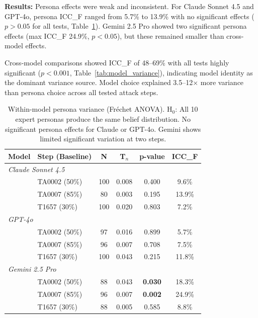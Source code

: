 \documentclass[midterm]{sparreport}
\begin{document}
\textbf{Results:} Persona effects were weak and inconsistent. For Claude Sonnet 4.5 and GPT-4o, persona ICC\_F ranged from 5.7\% to 13.9\% with no significant effects ($p > 0.05$ for all tests, Table~\ref{tab:persona_variance}). Gemini 2.5 Pro showed two significant persona effects (max ICC\_F 24.9\%, $p < 0.05$), but these remained smaller than cross-model effects.

Cross-model comparisons showed ICC\_F of 48--69\% with all tests highly significant ($p < 0.001$, Table~\ref{tab:model_variance}), indicating model identity as the dominant variance source. Model choice explained 3.5--12$\times$ more variance than persona choice across all tested attack steps.

\begin{table}[htbp]
\centering
\caption{Within-model persona variance (Fréchet ANOVA). H$_0$: All 10 expert personas produce the same belief distribution. No significant persona effects for Claude or GPT-4o. Gemini shows limited significant variation at two steps.}
\label{tab:persona_variance}
\begin{tabular}{llcccc}
\toprule
\textbf{Model} & \textbf{Step (Baseline)} & \textbf{N} & \textbf{T$_n$} & \textbf{p-value} & \textbf{ICC\_F} \\
\midrule
\multicolumn{6}{l}{\textit{Claude Sonnet 4.5}} \\
& TA0002 (50\%) & 100 & 0.008 & 0.400 & 9.6\% \\
& TA0007 (85\%) & 80 & 0.003 & 0.195 & 13.9\% \\
& T1657 (30\%) & 100 & 0.020 & 0.803 & 7.2\% \\
\midrule
\multicolumn{6}{l}{\textit{GPT-4o}} \\
& TA0002 (50\%) & 97 & 0.016 & 0.899 & 5.7\% \\
& TA0007 (85\%) & 96 & 0.007 & 0.708 & 7.5\% \\
& T1657 (30\%) & 100 & 0.043 & 0.215 & 11.8\% \\
\midrule
\multicolumn{6}{l}{\textit{Gemini 2.5 Pro}} \\
& TA0002 (50\%) & 88 & 0.043 & \textbf{0.030} & 18.3\% \\
& TA0007 (85\%) & 96 & 0.007 & \textbf{0.002} & 24.9\% \\
& T1657 (30\%) & 88 & 0.005 & 0.585 & 8.8\% \\
\bottomrule
\end{tabular}
\end{table}
\end{document}
